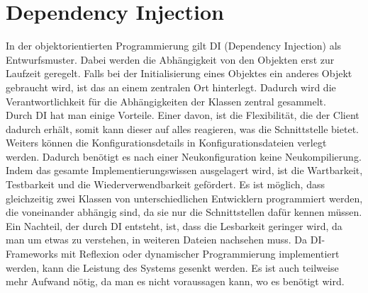 \newpage

\section{Dependency Injection}
In der objektorientierten Programmierung gilt DI (Dependency Injection) als Entwurfsmuster. Dabei werden die Abhängigkeit von den Objekten erst zur Laufzeit geregelt. Falls bei der Initialisierung eines Objektes ein anderes Objekt gebraucht wird, ist das an einem zentralen Ort hinterlegt. Dadurch wird die Verantwortlichkeit für die Abhängigkeiten der Klassen zentral gesammelt.\autocite{wikiDI}\\
Durch DI hat man einige Vorteile. Einer davon, ist die Flexibilität, die der Client dadurch erhält, somit kann dieser auf alles reagieren, was die Schnittstelle bietet. Weiters können die Konfigurationsdetails in Konfigurationsdateien verlegt werden. Dadurch benötigt es nach einer Neukonfiguration keine Neukompilierung. Indem das gesamte Implementierungswissen ausgelagert wird, ist die Wartbarkeit, Testbarkeit und die Wiederverwendbarkeit gefördert. Es ist möglich, dass gleichzeitig zwei Klassen von unterschiedlichen Entwicklern programmiert werden, die voneinander abhängig sind, da sie nur die Schnittstellen dafür kennen müssen.\autocite{wikiDI}\\
Ein Nachteil, der durch DI entsteht, ist, dass die Lesbarkeit geringer wird, da man um etwas zu verstehen, in weiteren Dateien nachsehen muss. Da DI-Frameworks mit Reflexion oder dynamischer Programmierung implementiert werden, kann die Leistung des Systems gesenkt werden. Es ist auch teilweise mehr Aufwand nötig, da man es nicht voraussagen kann, wo es benötigt wird. \autocite{wikiDI}
